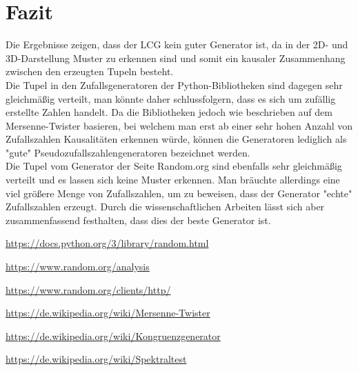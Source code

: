 \documentclass[12pt]{article}
\begin{document}
    \section{Fazit}\label{sec:fazit}
    Die Ergebnisse zeigen, dass der LCG kein guter Generator ist,
    da in der 2D- und 3D-Darstellung Muster zu erkennen sind und somit ein kausaler Zusammenhang zwischen den erzeugten Tupeln besteht.
    \\
    Die Tupel in den Zufallsgeneratoren der Python-Bibliotheken sind dagegen sehr gleichmäßig verteilt,
    man könnte daher schlussfolgern, dass es sich um zufällig erstellte Zahlen handelt.
    Da die Bibliotheken jedoch wie beschrieben auf dem Mersenne-Twister basieren,
    bei welchem man erst ab einer sehr hohen Anzahl von Zufallszahlen Kausalitäten erkennen würde,
    können die Generatoren lediglich als "gute" Pseudozufallszahlengeneratoren bezeichnet werden.
    \\
    Die Tupel vom Generator der Seite Random.org sind ebenfalls sehr gleichmäßig verteilt und es lassen sich keine Muster erkennen.
    Man bräuchte allerdings eine viel größere Menge von Zufallszahlen, um zu beweisen, dass der Generator "echte" Zufallszahlen erzeugt.
    Durch die wissenschaftlichen Arbeiten lässt sich aber zusammenfassend festhalten, dass dies der beste Generator ist.


    \vfill

    \begin{thebibliography}{12345}

        \url{https://docs.python.org/3/library/random.html}

        \url{https://www.random.org/analysis}

        \url{https://www.random.org/clients/http/}

        \url{https://de.wikipedia.org/wiki/Mersenne-Twister}

        \url{https://de.wikipedia.org/wiki/Kongruenzgenerator}

        \url{https://de.wikipedia.org/wiki/Spektraltest}

    \end{thebibliography}
\end{document}

